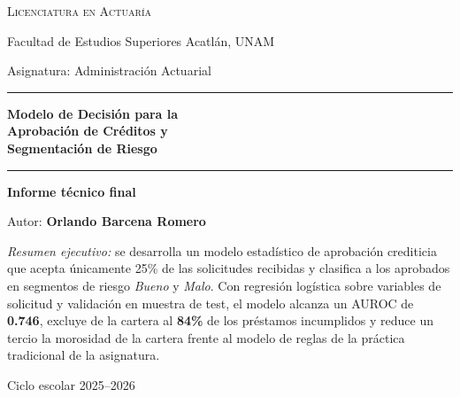 \documentclass[11pt,letterpaper]{article}
\begin{document}
\begin{titlepage}
  \centering
  {\Large \textsc{Licenciatura en Actuaría}\par}
  {\large Facultad de Estudios Superiores Acatlán, UNAM\par}
  {\large Asignatura: Administración Actuarial\par}
  \vspace{1.2cm}
  {\color{azulfuerte}\rule{\linewidth}{1.2pt}\par}
  \vspace{0.8cm}
  {\Huge\bfseries\color{azulfuerte} Modelo de Decisión para la\\[2pt]
   Aprobación de Créditos y\\[2pt] Segmentación de Riesgo\par}
  \vspace{0.8cm}
  {\color{azulfuerte}\rule{\linewidth}{1.2pt}\par}
  \vspace{1.2cm}
  {\large\bfseries Informe técnico final\par}
  \vspace{0.4cm}
  {\large Autor: \textbf{Orlando Barcena Romero}\par}
  \vspace{1.5cm}
  \begin{minipage}{0.72\linewidth}
    \small
    \textit{Resumen ejecutivo:} se desarrolla un modelo estadístico de
    aprobación crediticia que acepta únicamente 25\% de las solicitudes
    recibidas y clasifica a los aprobados en segmentos de riesgo
    \textit{Bueno} y \textit{Malo}. Con regresión logística sobre variables de
    solicitud y validación en muestra de test, el modelo alcanza un AUROC de
    \textbf{0.746}, excluye de la cartera al \textbf{84\%} de los préstamos
    incumplidos y reduce un tercio la morosidad de la cartera frente al
    modelo de reglas de la práctica tradicional de la asignatura.
  \end{minipage}
  \vfill
  {\large Ciclo escolar 2025--2026\par}
\end{titlepage}

\tableofcontents
\newpage
\end{document}
